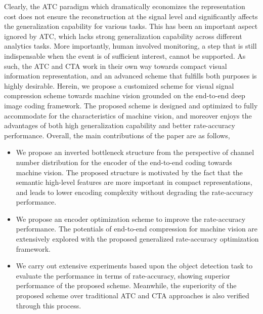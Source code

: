 \documentclass[transmag]{IEEEtran}
\begin{document}
Clearly, the ATC paradigm which dramatically economizes the representation cost does not ensure the reconstruction at the signal level and significantly affects the generalization capability for various tasks. This has been an important aspect ignored by ATC, which lacks strong generalization capability across different analytics tasks. More importantly, human involved monitoring, a step that is still indispensable when the event is of sufficient interest, cannot be supported. As such, the ATC and CTA work in their own way towards compact visual information representation, and an advanced scheme that fulfills both purposes is highly desirable. 
Herein, we propose a customized scheme for visual signal compression scheme towards machine vision grounded on the end-to-end deep image coding framework. The proposed scheme is designed and optimized to fully accommodate for the characteristics of machine vision, and moreover enjoys the advantages of both high generalization capability and better rate-accuracy performance. Overall, the main contributions of the paper are as follows, 
\begin{itemize}
\item We propose an inverted bottleneck structure from the perspective of channel number distribution for the encoder of the end-to-end coding towards machine vision. The proposed structure is motivated by the fact that the semantic high-level features are more important in compact representations, and leads to lower encoding complexity without degrading the rate-accuracy performance. 
\item We propose an encoder optimization scheme to improve the rate-accuracy performance. The potentials of end-to-end compression for machine vision are extensively explored with the proposed generalized rate-accuracy optimization framework. 
\item We carry out extensive experiments based upon the object detection task to evaluate the performance in terms of rate-accuracy, showing superior performance of the proposed scheme.  Meanwhile, the superiority of the proposed scheme over traditional ATC and CTA approaches is also verified through this process. %
\end{itemize}
\end{document}
